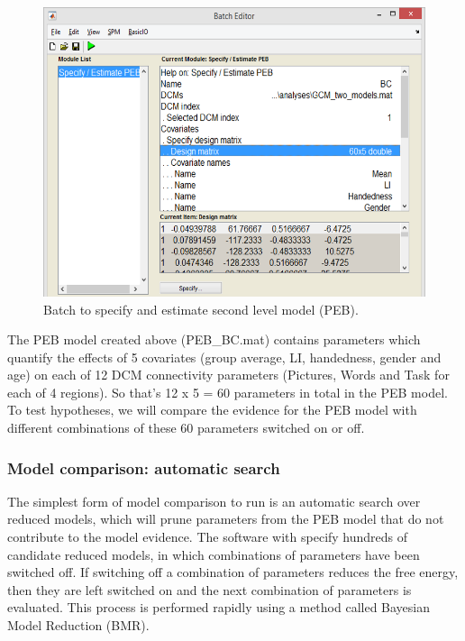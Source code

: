 \documentclass{article}
\begin{document}
\begin{figure}[ht]
\begin{center}
\includegraphics{"Fig_batch_specify_peb"}
\caption{Batch to specify and estimate second level model (PEB). \label{Fig_batch_specify_peb}}
\end{center}
\end{figure}

The PEB model created above (PEB\_BC.mat) contains parameters which quantify the effects of 5 covariates (group average, LI, handedness, gender and age) on each of 12 DCM connectivity parameters (Pictures, Words and Task for each of 4 regions). So that's 12 x 5 = 60 parameters in total in the PEB model. To test hypotheses, we will compare the evidence for the PEB model with different combinations of these 60 parameters switched on or off.

\subsubsection{Model comparison: automatic search} \label{GUI_search}

The simplest form of model comparison to run is an automatic search over reduced models, which will prune parameters from the PEB model that do not contribute to the model evidence. The software with specify hundreds of candidate reduced models, in which combinations of parameters have been switched off. If switching off a combination of parameters reduces the free energy, then they are left switched on and the next combination of parameters is evaluated. This process is performed rapidly using a method called Bayesian Model Reduction (BMR).
\end{document}
